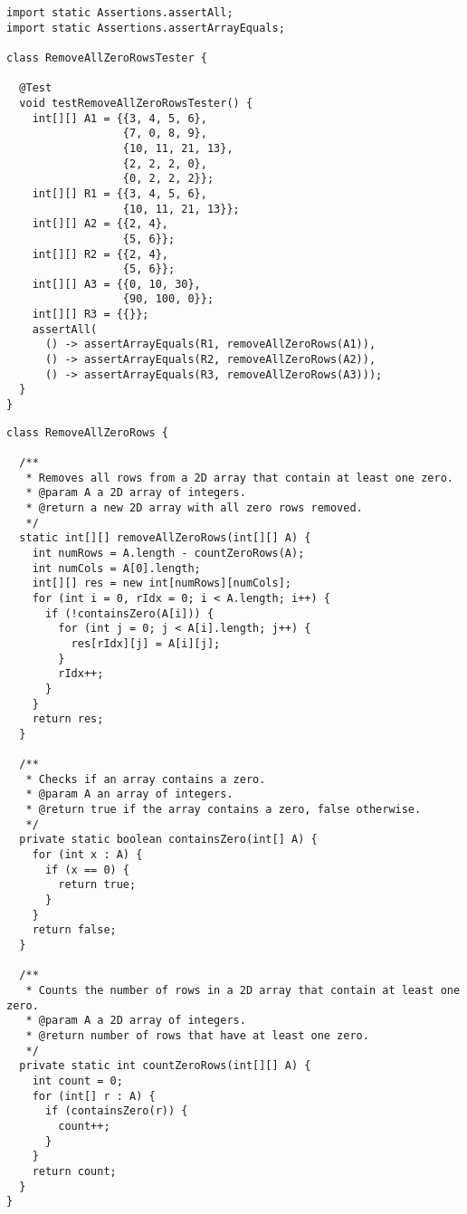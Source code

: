 \begin{lstlisting}[language=MyJava]
import static Assertions.assertAll;
import static Assertions.assertArrayEquals;

class RemoveAllZeroRowsTester {

  @Test
  void testRemoveAllZeroRowsTester() {
    int[][] A1 = {{3, 4, 5, 6}, 
                  {7, 0, 8, 9}, 
                  {10, 11, 21, 13}, 
                  {2, 2, 2, 0}, 
                  {0, 2, 2, 2}};
    int[][] R1 = {{3, 4, 5, 6}, 
                  {10, 11, 21, 13}};
    int[][] A2 = {{2, 4}, 
                  {5, 6}};
    int[][] R2 = {{2, 4}, 
                  {5, 6}};
    int[][] A3 = {{0, 10, 30},
                  {90, 100, 0}};
    int[][] R3 = {{}};
    assertAll(
      () -> assertArrayEquals(R1, removeAllZeroRows(A1)),
      () -> assertArrayEquals(R2, removeAllZeroRows(A2)),
      () -> assertArrayEquals(R3, removeAllZeroRows(A3)));
  }
}
\end{lstlisting}

\enlargethispage{-4\baselineskip}
\begin{lstlisting}[language=MyJava]
class RemoveAllZeroRows {

  /**
   * Removes all rows from a 2D array that contain at least one zero.
   * @param A a 2D array of integers.
   * @return a new 2D array with all zero rows removed.
   */
  static int[][] removeAllZeroRows(int[][] A) {
    int numRows = A.length - countZeroRows(A);
    int numCols = A[0].length;
    int[][] res = new int[numRows][numCols];
    for (int i = 0, rIdx = 0; i < A.length; i++) {
      if (!containsZero(A[i])) {
        for (int j = 0; j < A[i].length; j++) {
          res[rIdx][j] = A[i][j];
        }
        rIdx++;
      }
    }
    return res;
  }

  /**
   * Checks if an array contains a zero.
   * @param A an array of integers.
   * @return true if the array contains a zero, false otherwise.
   */
  private static boolean containsZero(int[] A) {
    for (int x : A) {
      if (x == 0) { 
        return true; 
      }
    }
    return false;
  }

  /**
   * Counts the number of rows in a 2D array that contain at least one zero.
   * @param A a 2D array of integers.
   * @return number of rows that have at least one zero.
   */
  private static int countZeroRows(int[][] A) {
    int count = 0;
    for (int[] r : A) {
      if (containsZero(r)) {
        count++;
      }
    }
    return count;
  }
}
\end{lstlisting}

